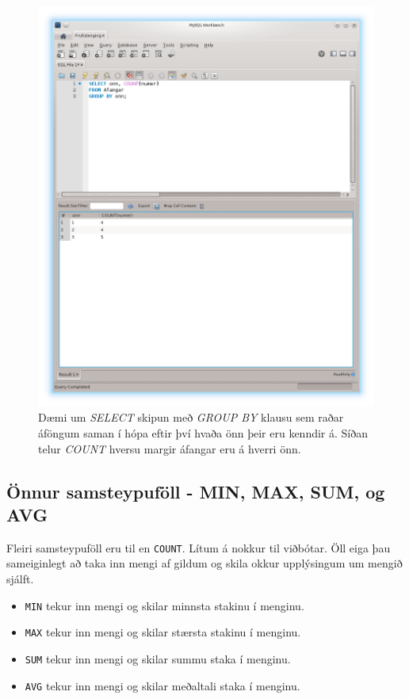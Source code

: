\begin{figure}
\caption[GROUP BY og COUNT eftir önnum]{Dæmi um \emph{SELECT} skipun með \emph{GROUP BY} klausu sem raðar áföngum saman í hópa eftir því hvaða önn þeir eru kenndir á. Síðan telur \emph{COUNT} hversu margir áfangar eru á hverri önn.}
\label{mynd:workbench-group-by-onn}
\centering
\includegraphics[width=\linewidth]{myndir/workbench-group-by-onn-stort}
\end{figure}

\newpage
\subsection{Önnur samsteypuföll - MIN, MAX, SUM, og AVG}
\label{undirkafli:onnur-samsteypufoll}
Fleiri samsteypuföll eru til en \verb|COUNT|. Lítum á nokkur til viðbótar. Öll eiga þau sameiginlegt að taka inn mengi af gildum og skila okkur upplýsingum um mengið sjálft.

\begin{itemize}
 \item \verb|MIN| tekur inn mengi og skilar minnsta stakinu í menginu.
 \item \verb|MAX| tekur inn mengi og skilar stærsta stakinu í menginu.
 \item \verb|SUM| tekur inn mengi og skilar summu staka í menginu.
 \item \verb|AVG| tekur inn mengi og skilar meðaltali staka í menginu.
\end{itemize}

